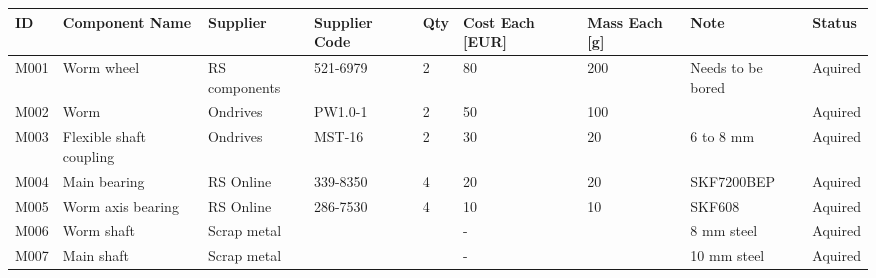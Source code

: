 

\begin{longtable}{|m{}|m{}|m{}|m{}|m{}|m{}|m{}|m{}|m{}|}

\textbf{ID} & \textbf{Component Name}             & \textbf{Supplier} & \textbf{Supplier  Code} & \textbf{Qty} & \textbf{Cost Each {[}EUR{]}} & \textbf{Mass Each {[}g{]}} & \textbf{Note}                                            & \textbf{Status} \\ \hline
M001        & Worm wheel                          & RS components     & 521-6979                & 2            & 80                           & 200                        & Needs to be bored                                        & Aquired         \\ \hline
M002        & Worm                                & Ondrives          & PW1.0-1                 & 2            & 50                           & 100                        &                                                          & Aquired         \\ \hline
M003        & Flexible shaft coupling             & Ondrives          & MST-16                  & 2            & 30                           & 20                         & 6 to 8 mm                                                & Aquired         \\ \hline
M004        & Main bearing                        & RS Online         & 339-8350                & 4            & 20                           & 20                         & SKF7200BEP                                               & Aquired         \\ \hline
M005        & Worm axis bearing                   & RS Online         & 286-7530                & 4            & 10                           & 10                         & SKF608                                                   & Aquired         \\ \hline
M006        & Worm shaft                          & Scrap metal       &                         &              & -                            &                            & 8 mm steel                                               & Aquired         \\ \hline
M007        & Main shaft                          & Scrap metal       &                         &              & -                            &                            & 10 mm steel                                              & Aquired         \\ \hline

\end{longtable}
